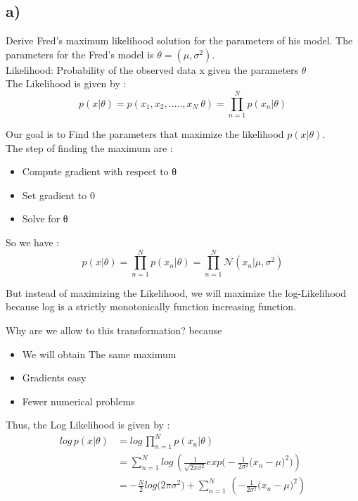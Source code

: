 \documentclass[12pt,twoside]{article}
\begin{document}
\subsection*{a)} Derive Fred’s maximum likelihood solution for the parameters of his model.
The parameters for the Fred's model is $\theta = (\mu, \sigma^2)$.\\
Likelihood: Probability of the observed data x given the parameters $\theta$\\

The Likelihood is given by :
\begin{equation*}
p(x| \theta) = p(x_1,x_2,....., x_N\ \theta) = \prod_{n=1}^{N} p(x_n| \theta)
\end{equation*}

Our goal is to Find the parameters that maximize the likelihood $p(x| \theta)$.\\
The step of finding the maximum are :
\begin{itemize}
	\item  Compute gradient with respect to θ
	\item  Set gradient to 0
	\item  Solve for θ
\end{itemize}

So we have :
\begin{equation*}
p(x| \theta) = \prod_{n=1}^{N} p(x_n| \theta) = \prod_{n=1}^{N} \mathcal{N}(x_n| \mu, \sigma^2)
\end{equation*}

But instead of maximizing the Likelihood, we will maximize the log-Likelihood because log is a strictly monotonically function increasing function.

Why are we allow to this transformation? because
\begin{itemize}
	\item  We will obtain The same maximum
	\item  Gradients easy
	\item  Fewer numerical problems
\end{itemize}

Thus, the Log Likelihood is given by :
\begin{align*}
log \,p(x| \theta) &= log \, \prod_{n=1}^{N} p(x_n| \theta) \\
				   &= \sum_{n=1}^{N} log \, \left( \frac{1}{\sqrt{2 \pi \sigma^2}} exp\big(-\frac{1}{2 \sigma^2}\big(x_n - \mu\big)^2\big) \right) \\
				   &= -\frac{N}{2} log\big(2 \pi \sigma^2\big) + \sum_{n=1}^{N}  \, \left( -\frac{1}{2 \sigma^2}\big(x_n - \mu\big)^2 \right) \\
\end{align*}
\end{document}

